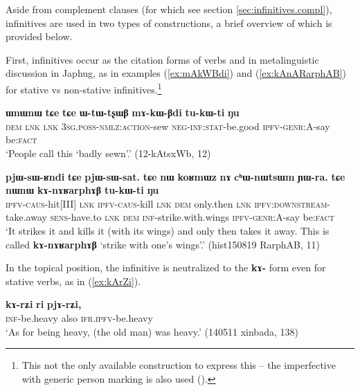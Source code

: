 \documentclass[oneside,a4paper,11pt]{article}
\newcommand{\ipa}[1]{\textbf{\phon#1}} %
\begin{document}
Aside from complement clauses (for which see section \ref{sec:infinitives.compl}), infinitives are used in two types of constructions, a brief overview of which is provided below.

First, infinitives occur as the citation forms of verbs and in metalinguistic discussion in Japhug, as in examples (\ref{ex:mAkWBdi}) and (\ref{ex:kAnARarphAB}) for stative vs non-stative infinitives.\footnote{This not the only available construction to express this -- the imperfective with generic person marking is also used (\citealt{jacques15generic}).}

\begin{exe}
\ex  \label{ex:mAkWBdi}
 \gll \ipa{ɯnɯnɯ} 	\ipa{tɕe} 	\ipa{tɕe} 	\ipa{ɯ-tɯ-tʂɯβ} 	\ipa{mɤ-kɯ-βdi} 	\ipa{tu-kɯ-ti} 	\ipa{ŋu} \\ 
 \textsc{dem} \textsc{lnk} \textsc{lnk} \textsc{3sg.poss-nmlz:action}-sew \textsc{neg-inf:stat}-be.good  \textsc{ipfv-genr}:A-say be:\textsc{fact}  \\
\glt  `People call this `badly sewn'.'  (12-kAtsxWb, 12)
\end{exe}

\begin{exe}
\ex \label{ex:kAnARarphAB}
 \gll \ipa{pjɯ-sɯ-ʁndi} 	\ipa{tɕe} 	\ipa{pjɯ-sɯ-sat.} \ipa{tɕe} 	\ipa{nɯ} 	\ipa{koʁmɯz} 	\ipa{nɤ} 	\ipa{cʰɯ-nɯtsɯm} 	\ipa{ɲɯ-ra.} \ipa{tɕe} 	\ipa{nɯnɯ} 	\ipa{kɤ-nɤʁarphɤβ} 	\ipa{tu-kɯ-ti} 	\ipa{ŋu} \\
 \textsc{ipfv-caus}-hit[III]  \textsc{lnk} \textsc{ipfv-caus}-kill \textsc{lnk} \textsc{dem} only.then \textsc{lnk} \textsc{ipfv:downstream}-take.away \textsc{sens}-have.to \textsc{lnk} \textsc{dem} \textsc{inf}-strike.with.wings \textsc{ipfv-genr}:A-say be:\textsc{fact}  \\
 \glt `It strikes it and kills it (with its wings) and only then takes it away. This is called \ipa{kɤ-nɤʁarphɤβ} `strike with one's wings'.' (hist150819 RarphAB, 11)
\end{exe}

In the topical position, the infinitive is neutralized to the \ipa{kɤ-} form even for stative verbs, as in (\ref{ex:kArZi}).

\begin{exe}
\ex \label{ex:kArZi}
 \gll
 \ipa{kɤ-rʑi} 	\ipa{ri} 	\ipa{pjɤ-rʑi,} 	  \\
 \textsc{inf}-be.heavy also \textsc{ifr.ipfv}-be.heavy \\
 \glt `As for being heavy, (the old man) was heavy.'  (140511 xinbada, 138)
\end{exe}
\end{document}
